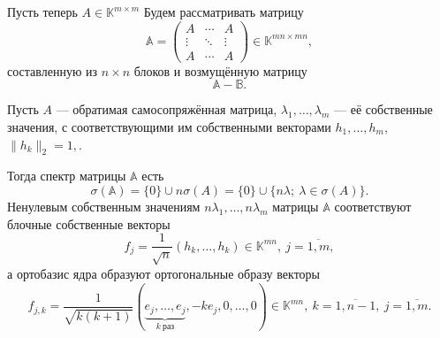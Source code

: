 Пусть теперь \( A\in \mathbb{K}^{m\times m} \)
Будем рассматривать матрицу
\[
    \mathbb{A} =
    \begin{pmatrix}
        A      & \cdots & A \\
        \vdots & \ddots & \vdots \\
        A      & \cdots & A
    \end{pmatrix}
    \in \mathbb{K}^{mn{\times}mn},
    \]
    составленную из \( n\times n \) блоков
    и возмущённую матрицу
\[
    \mathbb{A} - \mathbb{B}.
    \]

\begin{ksvlem}
    Пусть \( A \) --- обратимая самосопряжённая матрица,
    \( \lambda_1, \ldots, \lambda_m \)
    --- её собственные значения,
    с соответствующими им собственными векторами
    \( h_1, \ldots, h_m \),
    \( \|h_k\|_2=1, \).

    Тогда спектр матрицы \( \mathbb{A} \) есть
    \[
        \sigma(\mathbb{A}) = \{0\} \cup n\sigma(A)
        = \{ 0 \} \cup \{ n\lambda;\ \lambda\in\sigma(A) \}.
        \]
    Ненулевым собственным значениям \( n\lambda_1, \ldots, n\lambda_m \)
    матрицы \( \mathbb{A} \)
    соответствуют блочные собственные векторы
    \[
        f_j = \frac{1}{\sqrt{n}}(h_k, \ldots, h_k)\in\mathbb{K}^{mn},
        \ j{=}\overline{1,m},
       \]
    а ортобазис ядра образуют ортогональные образу
    векторы
    \[
        f_{j,k} =
        \frac{1}{\sqrt{k(k+1)}}
        (\underbrace{e_j,\ldots,e_j}_{k\ \text{раз}}, -ke_j, 0, \ldots, 0)\in\mathbb{K}^{mn},
        \ k{=}\overline{1,n-1},
        \ j{=}\overline{1,m}.
        \]
\end{ksvlem}
